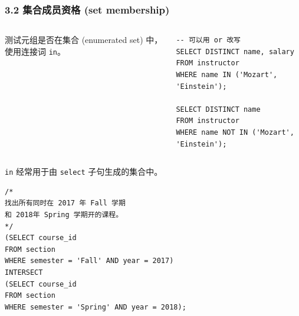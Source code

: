 \documentclass[aspectratio=169, 14pt]{beamer}
\begin{document}
\begin{frame}[fragile]
	\frametitle{3.2 集合成员资格 (set membership)}
	\begin{columns}

		测试元组是否在集合 (enumerated set) 中，使用连接词 \texttt{in}。

		\begin{verbatim}
-- 可以用 or 改写
SELECT DISTINCT name, salary
FROM instructor
WHERE name IN ('Mozart', 'Einstein');

SELECT DISTINCT name
FROM instructor
WHERE name NOT IN ('Mozart', 'Einstein');
    \end{verbatim}

	\end{columns}

\end{frame}

\begin{frame}[fragile]
	\texttt{in} 经常用于由 \texttt{select} 子句生成的集合中。

	\begin{verbatim}
/*
找出所有同时在 2017 年 Fall 学期
和 2018年 Spring 学期开的课程。
*/
(SELECT course_id
FROM section
WHERE semester = 'Fall' AND year = 2017)
INTERSECT
(SELECT course_id
FROM section
WHERE semester = 'Spring' AND year = 2018);
\end{verbatim}

\end{frame}
\end{document}
